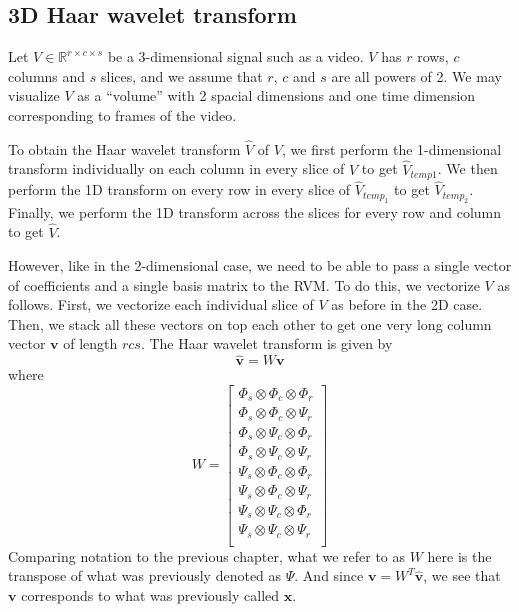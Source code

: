 \documentclass[final,3p]{report}
\let\bs\boldsymbol
\begin{document}
\subsection{3D Haar wavelet transform}
Let $V \in \mathbb{R}^{r\times c\times s}$ be a 3-dimensional signal such as a video. 
$V$ has $r$ rows, $c$ columns and $s$ slices, and we assume that $r$, $c$ and $s$ are all powers of 2. 
We may visualize $V$ as a ``volume'' with 2 spacial dimensions and one time dimension corresponding to frames of the video.

To obtain the Haar wavelet transform $\hat V$ of $V$, we first perform the 1-dimensional transform individually on each column in every slice of $V$ to get $\hat V_{temp1}$.
We then perform the 1D transform on every row in every slice of $\hat V_{temp_1}$ to get $\hat V_{temp_2}$.
Finally, we perform the 1D transform across the slices for every row and column to get $\hat V$.

However, like in the 2-dimensional case, we need to be able to pass a single vector of coefficients and a single basis matrix to the RVM.
To do this, we vectorize $V$ as follows. 
First, we vectorize each individual slice of $V$ as before in the 2D case.
Then, we stack all these vectors on top each other to get one very long column vector $\bs v$ of length $rcs$.
The Haar wavelet transform is given by 
\begin{equation*}
\hat{\bs v} = W \bs v
\end{equation*}
where 
\begin{equation*}
W = 
\begin{bmatrix}
\Phi_s \otimes \Phi_c \otimes \Phi_r \\
\Phi_s \otimes \Phi_c \otimes \Psi_r \\
\Phi_s \otimes \Psi_c \otimes \Phi_r \\
\Phi_s \otimes \Psi_c \otimes \Psi_r \\
\Psi_s \otimes \Phi_c \otimes \Phi_r \\
\Psi_s \otimes \Phi_c \otimes \Psi_r \\
\Psi_s \otimes \Psi_c \otimes \Phi_r \\
\Psi_s \otimes \Psi_c \otimes \Psi_r \\
\end{bmatrix}
\end{equation*}
Comparing notation to the previous chapter, what we refer to as $W$ here is the transpose of what was previously denoted as $\Psi$.
And since $\bs v = W^T \hat{\bs v}$, we see that $\bs v$ corresponds to what was previously called $\bs x$. 
\end{document}
